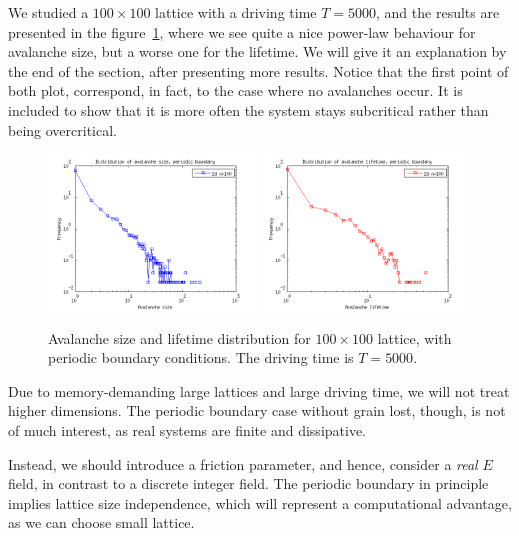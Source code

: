 We studied a $100\times 100$ lattice with a driving time $T=5000$, and the results are presented in the figure~\ref{sp}, 
where we see quite a nice power-law behaviour for avalanche size, but a worse one for the lifetime. 
We will give it an explanation by the end of the section, after presenting more results. 
Notice that the first point of both plot, correspond, in fact, to the case where no avalanches occur. 
It is included to show that it is more often the system stays subcritical rather than being overcritical. 



\begin{figure} 
\begin{center}
\includegraphics[width=0.49\textwidth]{results/sp.png}
\includegraphics[width=0.49\textwidth]{results/tp.png} 
\caption{Avalanche size and lifetime distribution for $100\times100$ lattice, with periodic boundary conditions. 
The driving time is $T=5000$. }
\label{sp}
\end{center}
\end{figure} 

Due to memory-demanding large lattices and large driving time, we will not treat higher dimensions.
The periodic boundary case without grain lost, though, is not of much interest, as real systems are finite and dissipative.

Instead, we should introduce a friction parameter, and hence, consider a \emph{real} $E$ field, in contrast to a discrete integer field. 
The periodic boundary in principle implies lattice size independence, which will represent a computational advantage, as we can choose small lattice.


